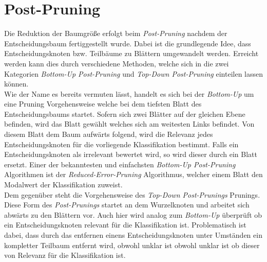 \section{Post-Pruning}
\label{post-pruning}
Die Reduktion der Baumgröße erfolgt beim \textit{Post-Pruning} nachdem der Entscheidungsbaum fertiggestellt wurde. Dabei ist die grundlegende Idee, dass Entscheidungsknoten bzw. Teilbäume zu Blättern umgewandelt werden. Erreicht werden kann dies durch verschiedene Methoden, welche sich in die zwei Kategorien \textit{Bottom-Up Post-Pruning} und \textit{Top-Down Post-Pruning} einteilen lassen können. \autocite{WikiPruning:online}\\
Wie der Name es bereits vermuten lässt, handelt es sich bei der \textit{Bottom-Up} um eine Pruning Vorgehensweise welche bei dem tiefsten Blatt des Entscheidungsbaums startet. Sofern sich zwei Blätter auf der gleichen Ebene befinden, wird das Blatt gewählt welches sich am weitesten Links befindet. \autocite{SebastianManteyPruning:online} Von diesem Blatt dem Baum aufwärts folgend, wird die Relevanz jedes Entscheidungsknoten für die vorliegende Klassifikation bestimmt. Falls ein Entscheidungsknoten als irrelevant bewertet wird, so wird dieser durch ein Blatt ersetzt. Einer der bekanntesten und einfachsten \textit{Bottom-Up Post-Pruning} Algorithmen ist der \textit{Reduced-Error-Pruning} Algorithmus, welcher einem Blatt den Modalwert der Klassifikation zuweist. \autocite{SebastianManteyPruning:online}\\
Dem gegenüber steht die Vorgehensweise des \textit{Top-Down Post-Prunings} Prunings. Diese Form des \textit{Post-Prunings} startet an dem Wurzelknoten und arbeitet sich abwärts zu den Blättern vor. Auch hier wird analog zum \textit{Bottom-Up} überprüft ob ein Entscheidungsknoten relevant für die Klassifikation ist. Problematisch ist dabei, dass durch das entfernen einens Entscheidungsknoten unter Umständen ein kompletter Teilbaum entfernt wird, obwohl unklar ist obwohl unklar ist ob dieser von Relevanz für die Klassifikation ist. \autocites{WikiPruning:online}{SebastianManteyPruning:online}